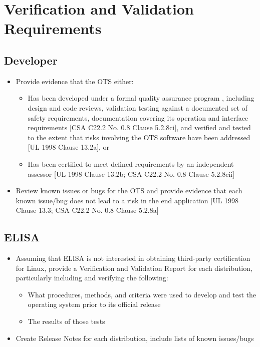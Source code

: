 \documentclass[12pt]{../Common_files/ElisaPaper}
\begin{document}
\section{Verification and Validation Requirements}
\subsection{Developer}

\begin{itemize}

\item Provide evidence that the OTS either:

\begin{itemize}

\item Has been developed under a formal quality assurance program , including design and code reviews, validation testing against a documented set of safety requirements, documentation covering its operation and interface requirements [CSA C22.2 No. 0.8 \cite{CSA0.8} Clause 5.2.8ci], and verified and tested to the extent that risks involving the OTS software have been addressed [UL 1998 \cite{UL1998} Clause 13.2a], or

\item Has been certified to meet defined requirements by an independent assessor [UL 1998 \cite{UL1998} Clause 13.2b; CSA C22.2 No. 0.8 \cite{CSA0.8} Clause 5.2.8cii]

\end{itemize}

\item Review known issues or bugs for the OTS and provide evidence that each known issue/bug does not lead to a risk in the end application [UL 1998 \cite{UL1998} Clause 13.3; CSA C22.2 No. 0.8 \cite{CSA0.8} Clause 5.2.8a]

\end{itemize}

\subsection{ELISA}

\begin{itemize}

\item Assuming that ELISA is not interested in obtaining third-party certification for Linux, provide a Verification and Validation Report  for each distribution, particularly including and verifying the following:

\begin{itemize}

\item What procedures, methods, and criteria were used to develop and test the operating system prior to its official release

\item The results of those tests

\end{itemize}

\item Create Release Notes for each distribution, include lists of known issues/bugs

\end{itemize}
\end{document}

